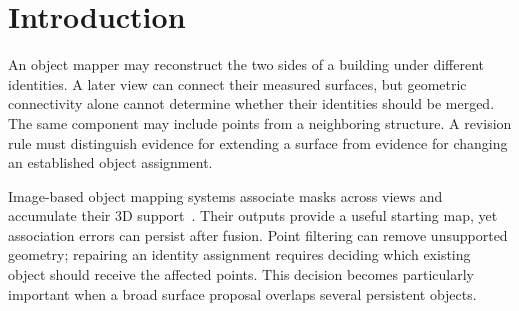 \maketitle
\begin{abstract}
A new surface observation can extend an object map while contradicting an earlier object assignment. Treating both updates as a single merge can join unrelated objects; keeping all earlier assignments leaves fragmented objects unresolved. We present a revision module that makes these decisions separately. Historical merges require shared-mask evidence to outweigh separate-object explanations across views, including after removal of any one observation. New measured points are assigned through local competition among object seeds supported by image masks. On two preselected KITTI-360 windows, the method improves mean building/car instance AP50:90 from 17.259 to 18.762. On four further spatial holdouts, AP rises from 20.263 to 23.171, although unconditional revision reaches 23.251. Controlled comparisons attribute the gains to protecting existing identities, consolidating selected fragments, and assigning new points locally. The results also show where conservative merge decisions suppress useful updates. A garage recording demonstrates the same revision module on LiDAR--inertial--visual mapping outputs.
\par\noindent Code: {\url{https://github.com/YanYaoyuan/omni_slam}}.
\end{abstract}

\section{Introduction}
An object mapper may reconstruct the two sides of a building under different identities. A later view can connect their measured surfaces, but geometric connectivity alone cannot determine whether their identities should be merged. The same component may include points from a neighboring structure. A revision rule must distinguish evidence for extending a surface from evidence for changing an established object assignment.

Image-based object mapping systems associate masks across views and accumulate their 3D support~\cite{cg,mc}. Their outputs provide a useful starting map, yet association errors can persist after fusion. Point filtering can remove unsupported geometry; repairing an identity assignment requires deciding which existing object should receive the affected points. This decision becomes particularly important when a broad surface proposal overlaps several persistent objects.

